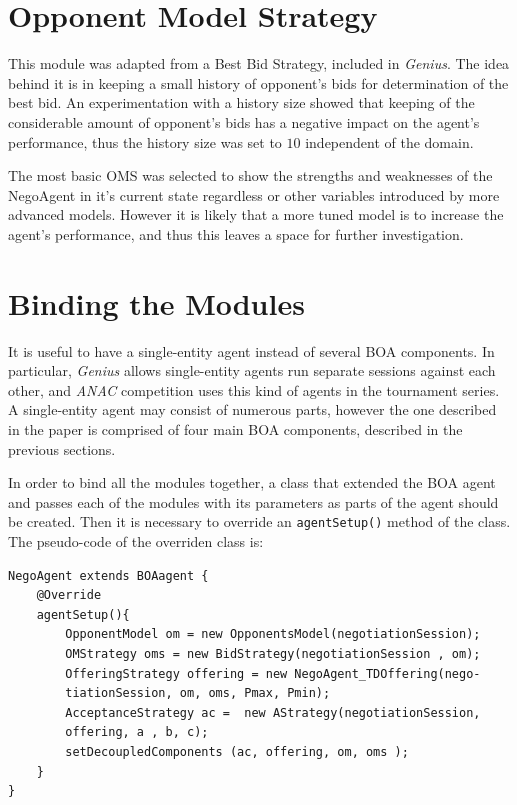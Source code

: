 \documentclass[html]{report}    %
\begin{document}
\section{Opponent Model Strategy}  

This module was adapted from a Best Bid Strategy, included in \textit{Genius}. The idea behind it is in keeping a small history of opponent's bids for determination of the best bid. An experimentation with a history size showed that keeping of the considerable amount of opponent's bids has a negative impact on the agent's performance, thus the history size was set to $10$ independent of the domain.

The most basic OMS was selected to show the strengths and weaknesses of the NegoAgent in it's current state regardless or other variables introduced by more advanced models. However it is likely that a more tuned model is to increase the agent's performance, and thus this leaves a space for further investigation.

\section{Binding the Modules}

It is useful to have a single-entity agent instead of several BOA components. In particular, \textit{Genius} allows single-entity agents run separate sessions against each other, and \textit{ANAC} competition uses this kind of agents in the tournament series. A single-entity agent may consist of numerous parts, however the one described in the paper is comprised of four main BOA components, described in the previous sections.

In order to bind all the modules together, a class that extended the BOA agent and passes each of the modules with its parameters as parts of the agent should be created. Then it is necessary to override an \texttt{agentSetup()} method of the class. The pseudo-code of the overriden class is:

\begin{verbatim}
NegoAgent extends BOAagent {    
    @Override
    agentSetup(){
        OpponentModel om = new OpponentsModel(negotiationSession);
        OMStrategy oms = new BidStrategy(negotiationSession , om);
        OfferingStrategy offering = new NegoAgent_TDOffering(nego-
        tiationSession, om, oms, Pmax, Pmin);
        AcceptanceStrategy ac =  new AStrategy(negotiationSession,
        offering, a , b, c);
        setDecoupledComponents (ac, offering, om, oms );
    }
}
\end{verbatim}
\end{document}
